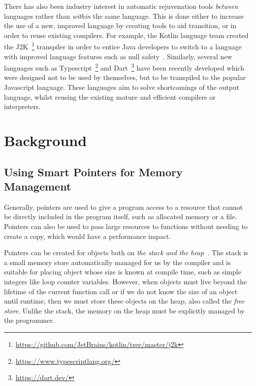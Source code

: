 \documentclass{mpaper}
\begin{document}
    There has also been industry interest in automatic rejuvenation tools \emph{between} languages rather than \emph{within} the same language. 
    This is done either to increase the use of a new, improved language by creating tools to aid transition, or in order to reuse existing compilers.
    For example, the Kotlin language team created the J2K~\footnote{\url{https://github.com/JetBrains/kotlin/tree/master/j2k}} transpiler in order to entice Java developers to switch to a language with improved language features such as null safety~\cite{Mateus2019}. 
    Similarly, several new languages such as Typescript~\footnote{\url{https://www.typescriptlang.org/}} and Dart~\footnote{\url{https://dart.dev/}} have been recently developed which were designed not to be used by themselves, but to be transpiled to the popular Javascript language.
    These languages aim to solve shortcomings of the output language, whilst reusing the existing mature and efficient compilers or interpreters.




    \section{Background}\label{sec:background}
    
    \subsection{Using Smart Pointers for Memory Management}\label{subsec:using-smart-pointers-for-memory-management}

    Generally, pointers are used to give a program access to a resource that cannot be directly included in the program itself, such as allocated memory or a file.
    Pointers can also be used to pass large resources to functions without needing to create a copy, which would have a performance impact. 
    
    Pointers can be created for objects both on \emph{the stack and the heap}~\cite{Stroustrup2000}. 
    The stack is a small memory store automatically managed for us by the compiler and is suitable for placing object whose size is known at compile time, such as simple integers like loop counter variables.
    However, when objects must live beyond the lifetime of the current function call or if we do not know the size of an object until runtime, then we must store these objects on the heap, also called the \emph{free store}. 
    Unlike the stack, the memory on the heap must be explicitly managed by the programmer.
    
\end{document}
